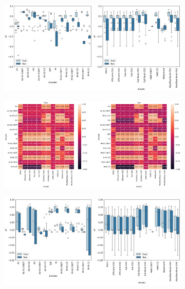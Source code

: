 \documentclass[journal=jacsat,manuscript=article]{achemso}
\begin{document}
\begin{figure}[H]
\begin{subfigure}[b]{0.49\textwidth}
		\caption{}
		\label{fig:sixteenquadratic_heatplots}
	\end{subfigure}
	\hfill
	\begin{subfigure}[b]{0.49\textwidth}
		\centering
		\includegraphics[width=\textwidth]{../images/Function_Fitting/sixteenqubit/quadratic_boxplots.png}
		\caption{}
		\label{fig:sixteenquadratic_boxplots}
	\end{subfigure}
	\hfill		
	\begin{subfigure}[b]{0.49\textwidth}
		\centering
		\includegraphics[width=\textwidth]{../images/Function_Fitting/sixteenqubit/sine_heatplots.png}
		\caption{}
		\label{fig:sixteensine_heatplots}
	\end{subfigure}
	\hfill		
	\begin{subfigure}[b]{0.49\textwidth}
		\centering
		\includegraphics[width=\textwidth]{../images/Function_Fitting/sixteenqubit/sine_boxplots.png}
		\caption{}
		\label{fig:sixteensine_boxplots}
	\end{subfigure}
	\hfill		
	\caption{}
	\label{fig:sixteensixteenqubit_ff_heat}
\end{figure}
\end{document}
